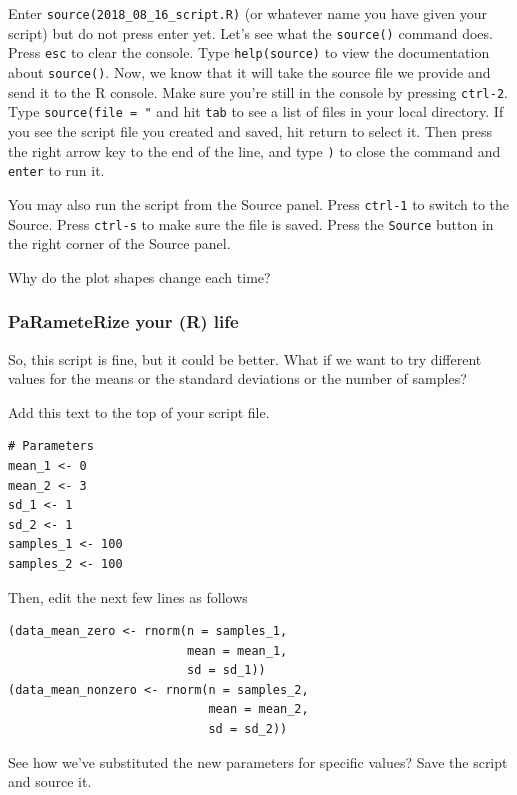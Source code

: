 \documentclass[]{article}
\begin{document}
Enter
\texttt{source(\textquotesingle{}2018\_08\_16\_script.R\textquotesingle{})}
(or whatever name you have given your script) but do not press enter
yet. Let's see what the \texttt{source()} command does. Press
\texttt{esc} to clear the console. Type
\texttt{help(\textquotesingle{}source\textquotesingle{})} to view the
documentation about \texttt{source()}. Now, we know that it will take
the source file we provide and send it to the R console. Make sure
you're still in the console by pressing \texttt{ctrl-2}. Type
\texttt{source(file\ =\ "} and hit \texttt{tab} to see a list of files
in your local directory. If you see the script file you created and
saved, hit return to select it. Then press the right arrow key to the
end of the line, and type \texttt{)} to close the command and
\texttt{enter} to run it.

You may also run the script from the Source panel. Press \texttt{ctrl-1}
to switch to the Source. Press \texttt{ctrl-s} to make sure the file is
saved. Press the \texttt{Source} button in the right corner of the
Source panel.

Why do the plot shapes change each time?

\subsubsection{PaRameteRize your (R)
life}\label{parameterize-your-r-life}

So, this script is fine, but it could be better. What if we want to try
different values for the means or the standard deviations or the number
of samples?

Add this text to the top of your script file.

\begin{verbatim}
# Parameters
mean_1 <- 0
mean_2 <- 3
sd_1 <- 1
sd_2 <- 1
samples_1 <- 100
samples_2 <- 100
\end{verbatim}

Then, edit the next few lines as follows

\begin{verbatim}
(data_mean_zero <- rnorm(n = samples_1, 
                         mean = mean_1, 
                         sd = sd_1))
(data_mean_nonzero <- rnorm(n = samples_2, 
                            mean = mean_2, 
                            sd = sd_2))
\end{verbatim}

See how we've substituted the new parameters for specific values? Save
the script and source it.
\end{document}

